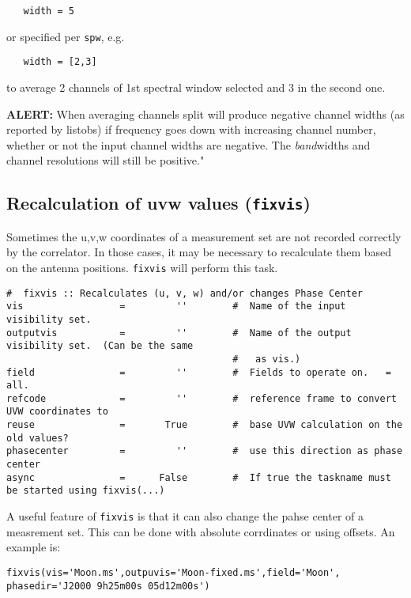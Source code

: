 \small
\begin{verbatim}
   width = 5
\end{verbatim}
\normalsize

or specified per {\tt spw}, e.g.

\small
\begin{verbatim}
   width = [2,3]
\end{verbatim}
\normalsize

to average 2 channels of 1st spectral window selected and 3 in the 
second one.


{\bf ALERT:} When averaging channels split will produce negative channel widths
(as reported by listobs) if frequency goes down with increasing channel
number, whether or not the input channel widths are negative.  The
\emph{band}widths and channel resolutions will still be positive."


\subsection{Recalculation of uvw values ({\tt fixvis})}
\label{section:cal.other.fixvis}

Sometimes the u,v,w coordinates of a measurement set are not recorded
correctly by the correlator. In those cases, it may be necessary to
recalculate them based on the antenna positions. {\tt fixvis} will
perform this task.


\small
\begin{verbatim}
#  fixvis :: Recalculates (u, v, w) and/or changes Phase Center 
vis                 =         ''        #  Name of the input visibility set.
outputvis           =         ''        #  Name of the output visibility set.  (Can be the same
                                        #   as vis.)
field               =         ''        #  Fields to operate on.   = all.
refcode             =         ''        #  reference frame to convert UVW coordinates to
reuse               =       True        #  base UVW calculation on the old values?
phasecenter         =         ''        #  use this direction as phase center
async               =      False        #  If true the taskname must be started using fixvis(...)
\end{verbatim}
\normalsize

A useful feature of {\tt fixvis} is that it can also change the pahse
center of a measrement set. This can be done with absolute corrdinates
or using offsets. An example is:
\small
\begin{verbatim}
fixvis(vis='Moon.ms',outpuvis='Moon-fixed.ms',field='Moon', phasedir='J2000 9h25m00s 05d12m00s')
\end{verbatim}
\normalsize

